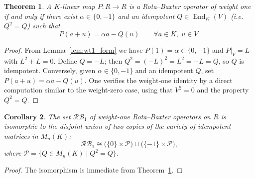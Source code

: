 \documentclass[a4paper,11pt]{elsarticle}
\newtheorem{theorem}{Theorem}[section]
\newtheorem{corollary}[theorem]{Corollary}
\theoremstyle{definition}
\theoremstyle{remark}
\DeclareMathOperator{\End}{End}
\begin{document}
\begin{theorem}\label{thm:wt1}
A $K$-linear map $P : R \to R$ is a Rota--Baxter operator of weight one if and only if there exist $\alpha \in \{0,-1\}$ and an idempotent $Q \in \End_K(V)$ (i.e. $Q^2 = Q$) such that
\[
P(a+u) = \alpha a - Q(u) \qquad \forall a \in K,\; u \in V.
\]
\end{theorem}

\begin{proof}
From Lemma~\ref{lem:wt1_form} we have $P(1) = \alpha \in \{0,-1\}$ and $P|_V = L$ with $L^2+L=0$.  Define $Q = -L$; then $Q^2 = (-L)^2 = L^2 = -L = Q$, so $Q$ is idempotent.  Conversely, given $\alpha \in \{0,-1\}$ and an idempotent $Q$, set $P(a+u) = \alpha a - Q(u)$.  One verifies the weight‑one identity by a direct computation similar to the weight‑zero case, using that $V^2=0$ and the property $Q^2 = Q$.
\end{proof}

\begin{corollary}\label{cor:wt1geo}
The set $\mathcal{RB}_1$ of weight‑one Rota--Baxter operators on $R$ is isomorphic to the disjoint union of two copies of the variety of idempotent matrices in $M_n(K)$:
\[
\mathcal{RB}_1 \cong \bigl(\{0\} \times \mathcal{P}\bigr) \sqcup \bigl(\{-1\} \times \mathcal{P}\bigr),
\]
where $\mathcal{P} = \{ Q \in M_n(K) \mid Q^2 = Q\}$.  
\end{corollary}

\begin{proof}
The isomorphism is immediate from Theorem~\ref{thm:wt1}.
\end{proof}


\end{document}
